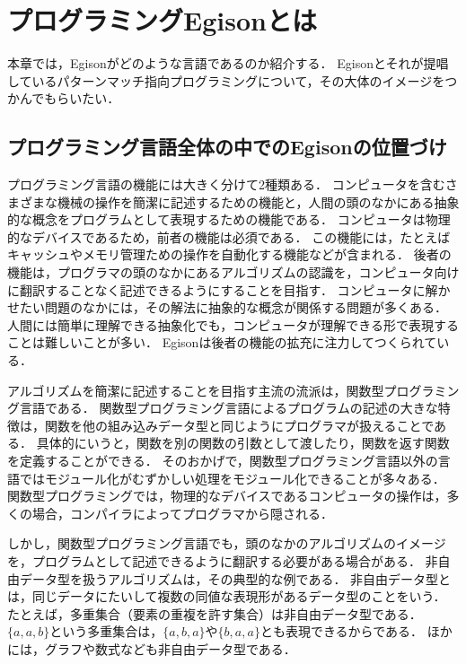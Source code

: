 \chapter{プログラミングEgisonとは}\label{intro}

本章では，Egisonがどのような言語であるのか紹介する．
Egisonとそれが提唱しているパターンマッチ指向プログラミングについて，その大体のイメージをつかんでもらいたい．

\section{プログラミング言語全体の中でのEgisonの位置づけ}\label{intro-egison}

プログラミング言語の機能には大きく分けて2種類ある．
コンピュータを含むさまざまな機械の操作を簡潔に記述するための機能と，人間の頭のなかにある抽象的な概念をプログラムとして表現するための機能である．
コンピュータは物理的なデバイスであるため，前者の機能は必須である．
この機能には，たとえばキャッシュやメモリ管理ための操作を自動化する機能などが含まれる．
後者の機能は，プログラマの頭のなかにあるアルゴリズムの認識を，コンピュータ向けに翻訳することなく記述できるようにすることを目指す．
コンピュータに解かせたい問題のなかには，その解法に抽象的な概念が関係する問題が多くある．
人間には簡単に理解できる抽象化でも，コンピュータが理解できる形で表現することは難しいことが多い．
Egisonは後者の機能の拡充に注力してつくられている．

アルゴリズムを簡潔に記述することを目指す主流の流派は，関数型プログラミング言語である．
関数型プログラミング言語によるプログラムの記述の大きな特徴は，関数を他の組み込みデータ型と同じようにプログラマが扱えることである．
具体的にいうと，関数を別の関数の引数として渡したり，関数を返す関数を定義することができる．
そのおかげで，関数型プログラミング言語以外の言語ではモジュール化がむずかしい処理をモジュール化できることが多々ある．
関数型プログラミングでは，物理的なデバイスであるコンピュータの操作は，多くの場合，コンパイラによってプログラマから隠される．

しかし，関数型プログラミング言語でも，頭のなかのアルゴリズムのイメージを，プログラムとして記述できるように翻訳する必要がある場合がある．
非自由データ型を扱うアルゴリズムは，その典型的な例である．
非自由データ型とは，同じデータにたいして複数の同値な表現形があるデータ型のことをいう．
たとえば，多重集合（要素の重複を許す集合）は非自由データ型である．
$\{a, a, b\}$という多重集合は，$\{a, b, a\}$や$\{b, a ,a\}$とも表現できるからである．
ほかには，グラフや数式なども非自由データ型である．

